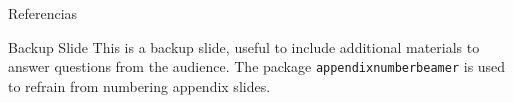 \documentclass{beamer}
\begin{document}
\appendix

\begin{frame}{Referencias}
	
	
\end{frame}


\begin{frame}{Backup Slide}
	This is a backup slide, useful to include additional materials to answer questions from the audience.
	\vfill
	The package \texttt{appendixnumberbeamer} is used to refrain from numbering appendix slides.
\end{frame}

\end{document}
